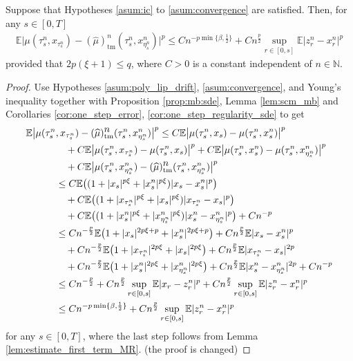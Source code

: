 \documentclass[10pt,a4paper]{amsart}
\newcommand{\E}{\mathbb E}
\begin{document}
\begin{lemma} \label{lem:conv_tame_drift}
	Suppose that Hypotheses \mbox{\normalfont  \ref{asum:ic}} to  \textnormal{\ref{asum:convergence}} are satisfied. Then, for any $s \in [0, T]$
	\begin{align*}
		\E\big|\mu(\tau_s^n,x_{\tau^n_s})-(\widehat {\mu})_{\mathrm{tm}}^{\displaystyle n}(\tau_s^n,x_{\eta^n_s}^{n})\big|^p\leq Cn^{-p\min\{\beta,\frac{1}{2}\}}+ Cn^{\frac{p}{2}}\sup_{ r\in[0,s]}\E|z_r^n-x_r^n|^p
	\end{align*}
	provided that $2p(\xi+1)\leq q$,	where $C>0$    is a constant independent of  $n\in \mathbb N$. 
\end{lemma}

\begin{proof}
	
	Use Hypotheses \ref{asum:poly_lip_drift}, \ref{asum:convergence}, and Young's inequality together with  Proposition \ref{prop:mb:sde}, Lemma \ref{lem:scm_mb}  and Corollaries \ref{cor:one_step_error}, \ref{cor:one_step_regularity_sde} to get 
	\begin{align}
		\E\big|\mu(\tau_s^n&,x_{\tau^n_s})-(\widehat {\mu})_{\mathrm{tm}}^{\displaystyle n}(\tau_s^n,x_{\eta^n_s}^{n})\big|^p
		\leq C	\E\big|\mu(\tau_s^n,x_{s})-{\mu}(\tau_s^n,x_{s}^{n})\big|^p\notag
		\\
		&\quad+C	\E\big|\mu(\tau_s^n,x_{\tau^n_s})-{\mu}(\tau_s^n,x_{s})\big|^p+C	\E\big|\mu(\tau_s^n,x_{s}^n)-{\mu}(\tau_s^n,x_{\eta^n_s}^{n})\big|^p\notag
		\\
		&\quad+C\E\big|\mu(\tau_s^n,x_{\eta^n_s}^n)-(\widehat {\mu})_{\mathrm{tm}}^{\displaystyle n}(\tau_s^n,x_{\eta^n_s}^{n})\big|^p\notag
		\\
		&\leq 	C\E\big((1+|x_{s}|^{p\xi}+|x_{s}^n|^{p \xi})|x_{s}-x_{s}^n|^{p}\big) \notag
		\\
		&\quad+C\E\big((1+|x_{\tau^n_s}|^{p\xi}+|x_{s}|^{p \xi})|x_{\tau^n_s}-x_{s}|^{p}\big) \notag
		\\
		&\quad+C\E\big((1+|x_{s}^n|^{p\xi}+|x_{\eta^n_s}^n|^{p \xi})|x_{s}^n-x_{\eta^n_s}^n|^{p}\big) +Cn^{-p} \notag
		\\
		&\leq 	Cn^{-\frac{p}{2}}\E\big(1+|x_{s}|^{2p\xi+p}+|x_{s}^n|^{2p\xi+p}\big)+Cn^{\frac{p}{2}}\E|x_{s}-x_{s}^n|^{p} \notag
		\\
		&\quad+Cn^{-\frac{p}{2}}\E\big(1+|x_{\tau^n_s}|^{2p\xi}+|x_{s}|^{2p\xi}\big)+Cn^{\frac{p}{2}}\E|x_{\tau^n_s}-x_{s}|^{2p} \notag
		\\
		&\quad+Cn^{-\frac{p}{2}}\E\big(1+|x_{s}^n|^{2p\xi}+|x_{\eta^n_s}^n|^{2p\xi}\big)+Cn^{\frac{p}{2}}\E|x_{s}^n-x_{\eta^n_s}^n|^{2p}  +Cn^{-p} \notag
		\\
		&\leq  Cn^{-\frac{p}{2}}+ Cn^{\frac{p}{2}}\sup_{ r\in[0,s]}\E|x_r-z_r^n|^p + Cn^{\frac{p}{2}}\sup_{ r\in[0,s]}\E|z_r^n-x_r^n|^p \notag
		\\
		&\leq  Cn^{-p\min\{\beta,\frac{1}{2}\}}+ Cn^{\frac{p}{2}}\sup_{ r\in[0,s]}\E|z_r^n-x_r^n|^p  \notag
	\end{align}
	for any $s\in[0,T]$, where the last step follows	from Lemma \ref{lem:estimate_first_term_MR}. {(the proof is changed)}
\end{proof}
\end{document}
